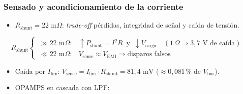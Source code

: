 \begin{frame}
\transdissolve
\frametitle{Sensado y acondicionamiento de la corriente}
\pause

\begin{itemize}
  \item $R_\text{shunt} = 22\text{ m}\Omega$: \textit{trade-off} pérdidas, integridad de señal y caída de tensión.
\end{itemize}

\pause
\vspace{-0.2cm}
{\footnotesize
\begin{equation*}
R_\text{shunt}
\begin{cases}
  \ \gg 22\text{ m}\Omega: & \uparrow P_\text{shunt}=I^{2}R \ \text{ y } \ \downarrow V_\text{carga}\quad (1\,\Omega \Rightarrow 3{,}7\text{ V de caída}) \\[3pt]
  \ \ll 22\text{ m}\Omega: & V_\text{sense} \approx  V_\text{EMI} \Rightarrow \text{disparos falsos}
\end{cases}
\end{equation*}
}
\vspace{-0.25cm}

\pause
\begin{itemize}
  \item Caída por $I_\text{lim}$: $V_\text{sense} = I_\text{lim}\cdot R_\text{shunt} = 81{,}4\text{ mV}$ ($\approx 0{,}081$\,\% de $V_\text{bus}$).
  \pause
  \item OPAMPS en cascada con LPF:
\end{itemize}


\end{frame}
